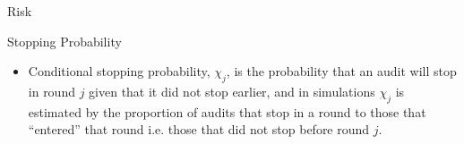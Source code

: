 \documentclass[final]{beamer}
\newlength{\colwidth}
\begin{document}
\begin{frame}[t]
\begin{columns}[t]
\begin{column}{\colwidth}
\begin{block}{Risk}
\end{block}


\begin{block}{Stopping Probability}

\begin{itemize}
\item
Conditional stopping probability, $\chi_j$, is the probability that an audit will stop in round $j$ given that it did not stop earlier, and in 
simulations $\chi_j$ is estimated by the proportion of audits that stop in a round to those that ``entered'' that round
i.e. those that did not stop before round $j$. 
\end{itemize}


\end{block}
\end{column}
\end{columns}
\end{frame}
\end{document}
